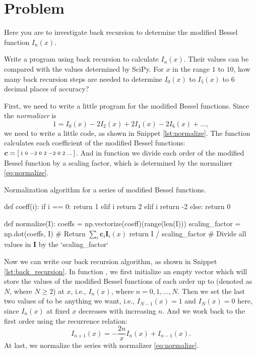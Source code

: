 \section{Problem \thesection}

Here you are to investigate back recursion to determine the modified Bessel function
$I_n(x)$.

\Question Write a program using back recursion to calculate $I_n(x)$.
Their values can be compared with the values determined by SciPy.
For $x$ in the range $1$ to $10$, how many back recursion steps are needed to
determine $I_0(x)$ to $I_5(x)$ to $6$ decimal places of accuracy?

\Answer First, we need to write a little program for the modified Bessel functions.
Since the \emph{normalizer} is
%
\begin{equation}\label{eq:normalize}
    1 = I_0(x) - 2 I_2(x) + 2 I_4(x) - 2 I_6(x) + \ldots,
\end{equation}
%
we need to write a little code, as shown in Snippet \ref{lst:normalize}.
The  function calculates each coefficient of the
modified Bessel functions: $\bm{c} = \begin{bsmallmatrix}1 & 0 & -2 & 0 & 2 & -2 & 0 & 2 & \ldots\end{bsmallmatrix}$.
And in function  we divide each order of the modified Bessel function
by a scaling factor, which is determined by the normalizer \eqref{eq:normalize}.

\begin{algorithm}
    \caption{Normalization algorithm for a series of modified Bessel functions.}
    \label{lst:normalize}
    \begin{pythoncode}
        def coeff(i):
            if i == 0:
                return 1
            elif i %
                return 2
            elif i %
                return -2
            else:
                return 0


        def normalize(I):
            coeffs = np.vectorize(coeff)(range(len(I)))
            scaling_factor = np.dot(coeffs, I)  # Return $\sum_i \bm{c}_i \bm{I}_i(x)$
            return I / scaling_factor  # Divide all values in $\bm{I}$ by the `scaling_factor`
    \end{pythoncode}
\end{algorithm}

Now we can write our back recursion algorithm, as shown in Snippet \ref{lst:back_recursion}.
In function , we first initialize an empty vector  which
will store the values of the modified Bessel functions of each order up to
 (denoted as $N$, where $N \geq 2$) at $x$, i.e., $I_n(x)$, where
$n = 0, 1, \ldots, N$.
Then we set the last two values of  to be anything we want, i.e.,
$I_{N-1}(x) = 1$ and $I_N(x) = 0$ here,
since $I_n(x)$ at fixed $x$ decreases with increasing $n$.
And we work back to the first order using the recurrence relation:
%
\begin{equation}
    I_{n + 1}(x) = -\frac{ 2 n }{ x } I_n(x) + I_{n - 1}(x).
\end{equation}
%
At last, we normalize the series with normalizer \eqref{eq:normalize}.

